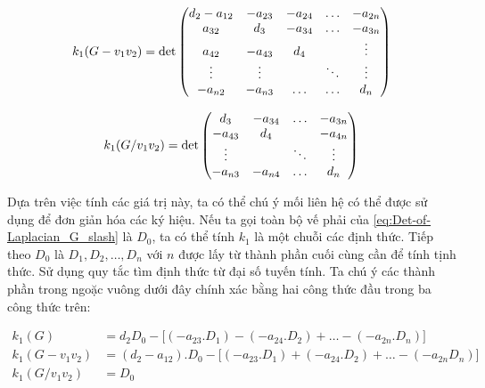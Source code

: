 \documentclass[14pt, a4paper]{article}
\numberwithin{equation}{section}
\numberwithin{figure}{section}
\numberwithin{dl}{section}
\numberwithin{md}{section}
\numberwithin{bd}{section}
\numberwithin{dn}{section}
\numberwithin{hq}{section}
\begin{document}
    \begin{equation}
        k_1(G - v_1 v_2) = \det\begin{pmatrix}
            d_2 - a_{12} & - a_{23} & - a_{24} & \hdots & - a_{2n} \\
            a_{32} & d_3 & - a_{34} & \hdots & - a_{3n} \\
            a_{42} & - a_{43} & d_4 & \thickspace & \vdots \\
            \vdots & \vdots & \thickspace & \ddots & \vdots \\
            - a_{n2} & - a_{n3} & \hdots & \hdots & d_n
        \end{pmatrix}
    \end{equation}

    \begin{equation} \label{eq:Det-of-Laplacian_G_slash}
        k_1 (G / v_1 v_2) = \det\begin{pmatrix}
            d_3 & - a_{34} & \hdots & - a_{3n} \\
            - a_{43} & d_4 & \thickspace & - a_{4n} \\
            \vdots & \thickspace & \ddots & \vdots \\
            - a_{n3} & - a_{n4} & \hdots & d_n 
        \end{pmatrix}
    \end{equation}

    Dựa trên việc tính các giá trị này, ta có thể chú ý mối liên hệ có thể được sử dụng để đơn giản hóa các ký hiệu.
    Nếu ta gọi toàn bộ vế phải của \ref{eq:Det-of-Laplacian_G_slash} là $D_0$, ta có thể tính $k_1$ là một chuỗi các định thức.
    Tiếp theo $D_0$ là $D_1, D_2, \hdots, D_n$ với $n$ được lấy từ thành phần cuối cùng cần để tính tịnh thức.
    Sử dụng quy tắc tìm định thức từ đại số tuyến tính.
    Ta chú ý các thành phần trong ngoặc vuông dưới đây chính xác bằng hai công thức đầu trong ba công thức trên:

    \begin{equation}
        \begin{aligned}
            k_1 (G) &= d_2 D_0 - \big \lbrack (-a_{23} . D_1) - (-a_{24}.D_2) + \hdots - (- a_{2n}. D_n) \big \rbrack \\
            k_1 (G - v_1 v_2) &= (d_2 - a_{12}). D_0 - \big \lbrack (- a_{23}. D_1) + (- a_{24}.D_2) + \hdots - (-a_{2n}D_n) \big \rbrack \\
            k_1 (G / v_1 v_2) &= D_0
        \end{aligned}
    \end{equation}
\end{document}

